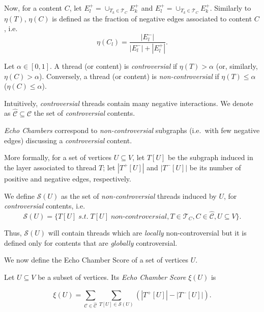 Now, for a content $C$, let $E^{+}_l = \cup_{T_k \in \mathcal{T} _C} E^+_k$ and $E^{+}_l = \cup_{T_k \in \mathcal{T} _C} E^+_k$.
Similarly to $\eta(T)$, $\eta(C)$ is defined as the fraction of negative edges associated to
content $C$, i.e.
\begin{equation*}
	\eta(C_l) = \frac{|E^{-}_{l}|}{|E^{-}_{l}| + |E^{+}_{l}|}.
\end{equation*}

\begin{definition}
	Let $\alpha \in [0,1]$. A thread (or content) is \emph{controversial} if
	$\eta(T) > \alpha$ (or, similarly, $\eta(C) > \alpha $). Conversely, a
	thread (or content) is \emph{non-controversial} if $\eta(T) \leq \alpha$
	($\eta(C) \leq \alpha$).
\end{definition}

Intuitively, \emph{controversial} threads contain many negative
interactions. We denote as $\hat{\mathcal{C} } \subseteq \mathcal{C} $ the
set of \emph{controversial} contents.

\medskip

\emph{Echo Chambers} correspond to \emph{non-controversial} subgraphs
(i.e.\ with few negative edges) discussing a
\emph{controversial} content.

More formally, for a set of vertices $U \subseteq V$, let $T[U]$ be the subgraph induced in the layer associated to
thread $T$; let $|T^{+} [U]|$ and $|T^{-} [U]|$ be its number
of positive and negative edges, respectively.

We define $\mathcal{S} (U)$ as the set of \emph{non-controversial} threads
induced by $U$, for \textit{controversial} contents, i.e.
	{\small
		\begin{equation}
			\mathcal{S} (U) = \{ T[U] \; s.t. \; T[U] \; non\text{-}controversial, T \in \mathcal{T} _{C}, C
			\in \hat{\mathcal{C}}, U \subseteq V\}.
		\end{equation}
	}

Thus, $\mathcal{S} (U)$ will contain threads which are \emph{locally}
non-controversial but it is defined only for contents that are \emph{globally}
controversial.

\medskip

We now define the Echo Chamber Score of a set of vertices $U$.

\begin{definition}
	Let $U \subseteq V$ be a subset of vertices. Its \emph{Echo Chamber Score}
	$\xi(U)$ is

	\begin{equation}
		\label{eq:echo-chamber-score}
		\xi(U) = \sum^{}_{\mathcal{C} \in \mathcal{\hat{C}}} \sum^{}_{T[U] \in
		\mathcal{S} (U)} (|T^{+} [U]| - |T ^{-} [U]|).
	\end{equation}
\end{definition}

